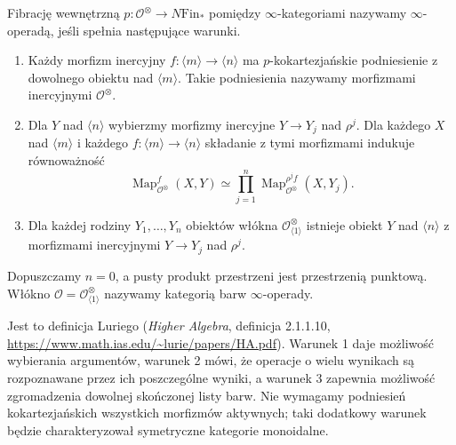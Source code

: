 \begin{definicja}\label{cat:def:infty-operad}
Fibrację wewnętrzną $p:\mathcal O^\otimes\to N\mathrm{Fin}_*$ pomiędzy $\infty$-kategoriami nazywamy $\infty$-operadą, jeśli spełnia następujące warunki.
\begin{enumerate}
 \item Każdy morfizm inercyjny $f:\langle m\rangle\to\langle n\rangle$ ma $p$-kokartezjańskie podniesienie z dowolnego obiektu nad $\langle m\rangle$. Takie podniesienia nazywamy morfizmami inercyjnymi $\mathcal O^\otimes$.
 \item Dla $Y$ nad $\langle n\rangle$ wybierzmy morfizmy inercyjne $Y\to Y_j$ nad $\rho^j$. Dla każdego $X$ nad $\langle m\rangle$ i każdego $f:\langle m\rangle\to\langle n\rangle$ składanie z tymi morfizmami indukuje równoważność
 \begin{equation}\label{cat:eq:infty-operad-mapping}
 \operatorname{Map}^{f}_{\mathcal O^\otimes}(X,Y)
 \simeq\prod_{j=1}^n
 \operatorname{Map}^{\rho^j f}_{\mathcal O^\otimes}(X,Y_j).
 \end{equation}
 \item Dla każdej rodziny $Y_1,\ldots,Y_n$ obiektów włókna $\mathcal O^\otimes_{\langle1\rangle}$ istnieje obiekt $Y$ nad $\langle n\rangle$ z morfizmami inercyjnymi $Y\to Y_j$ nad $\rho^j$.
\end{enumerate}
Dopuszczamy $n=0$, a pusty produkt przestrzeni jest przestrzenią punktową. Włókno $\mathcal O=\mathcal O^\otimes_{\langle1\rangle}$ nazywamy kategorią barw $\infty$-operady.
\end{definicja}

Jest to definicja Luriego (\emph{Higher Algebra}, definicja 2.1.1.10, \url{https://www.math.ias.edu/~lurie/papers/HA.pdf}). Warunek 1 daje możliwość wybierania argumentów, warunek 2 mówi, że operacje o wielu wynikach są rozpoznawane przez ich poszczególne wyniki, a warunek 3 zapewnia możliwość zgromadzenia dowolnej skończonej listy barw. Nie wymagamy podniesień kokartezjańskich wszystkich morfizmów aktywnych; taki dodatkowy warunek będzie charakteryzował symetryczne kategorie monoidalne.

